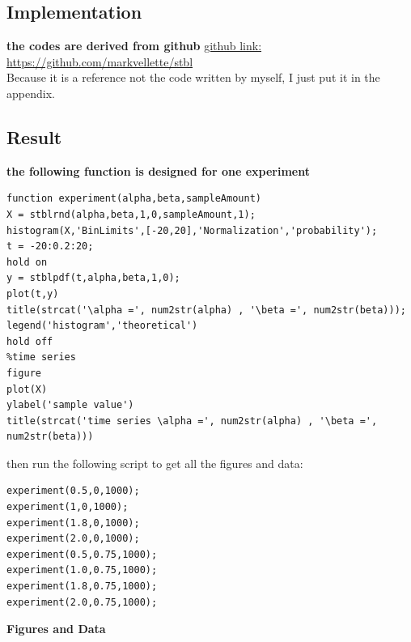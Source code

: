 \documentclass[twoside]{article}
\begin{document}
\begin{multicols*}{2}
\subsection{\normalsize{Implementation}}
\noindent \textbf {the codes are derived from github }{\href{https://github.com/markveillette/stbl}{github link: https://github.com/markvellette/stbl} }\\
Because it is a reference not the code written by myself, I just put it in the appendix.\\
\subsection{\normalsize{Result}}
\noindent \textbf {the following function is designed for one experiment}\\
\begin{lstlisting}
function experiment(alpha,beta,sampleAmount)
X = stblrnd(alpha,beta,1,0,sampleAmount,1);
histogram(X,'BinLimits',[-20,20],'Normalization','probability');
t = -20:0.2:20;
hold on
y = stblpdf(t,alpha,beta,1,0);
plot(t,y)
title(strcat('\alpha =', num2str(alpha) , '\beta =', num2str(beta)));
legend('histogram','theoretical')
hold off
%time series
figure
plot(X)
ylabel('sample value')
title(strcat('time series \alpha =', num2str(alpha) , '\beta =', num2str(beta)))
\end{lstlisting}
then run the following script to get all the figures and data:\\
\begin{lstlisting}
experiment(0.5,0,1000);
experiment(1,0,1000);
experiment(1.8,0,1000);
experiment(2.0,0,1000);
experiment(0.5,0.75,1000);
experiment(1.0,0.75,1000);
experiment(1.8,0.75,1000);
experiment(2.0,0.75,1000);
\end{lstlisting}
\noindent \textbf {Figures and Data}

\end{multicols*}
\end{document}

